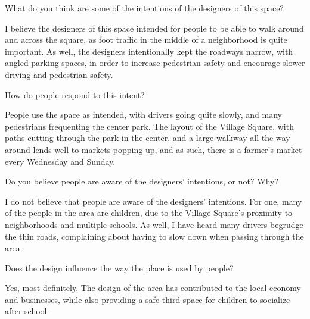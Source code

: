 \begin{homeworkProblem}

	What do you think are some of the intentions of the designers of this space?

	\solution

	I believe the designers of this space intended for people to be able to walk around and across the square, as foot traffic in the middle of a neighborhood is quite important. As well, the designers intentionally kept the roadways narrow, with angled parking spaces, in order to increase pedestrian safety and encourage slower driving and pedestrian safety.

\end{homeworkProblem}

\begin{homeworkProblem}

	How do people respond to this intent?

	\solution

	People use the space as intended, with drivers going quite slowly, and many pedestrians frequenting the center park. The layout of the Village Square, with paths cutting through the park in the center, and a large walkway all the way around lends well to markets popping up, and as such, there is a farmer's market every Wednesday and Sunday.

\end{homeworkProblem}

\begin{homeworkProblem}

	Do you believe people are aware of the designers' intentions, or not? Why?

	\solution

	I do not believe that people are aware of the designers' intentions. For one, many of the people in the area are children, due to the Village Square's proximity to neighborhoods and multiple schools. As well, I have heard many drivers begrudge the thin roads, complaining about having to slow down when passing through the area.

\end{homeworkProblem}

\begin{homeworkProblem}

	Does the design influence the way the place is used by people?

	\solution

	Yes, most definitely. The design of the area has contributed to the local economy and businesses, while also providing a safe third-space for children to socialize after school.

\end{homeworkProblem}


